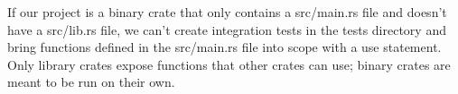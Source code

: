 If our project is a binary crate that only contains a src/main.rs file and doesn’t have a src/lib.rs file, 
we can’t create integration tests in the tests directory and bring functions defined in the src/main.rs file into scope with a use statement. 
Only library crates expose functions that other crates can use; binary crates are meant to be run on their own.